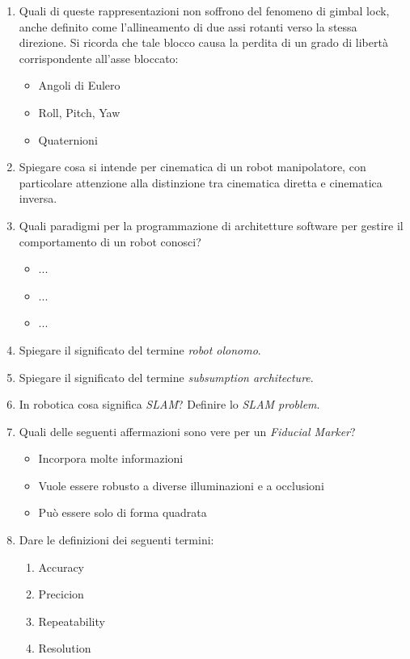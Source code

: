 \documentclass[a4paper,portrait,12pt]{article}
\theoremstyle{definition}
\begin{document}
\begin{enumerate}
\item Quali di queste rappresentazioni non soffrono del fenomeno di gimbal lock, anche definito come l'allineamento di due assi rotanti verso la stessa direzione.
Si ricorda che tale blocco causa la perdita di un grado di libertà corrispondente all'asse bloccato:
\begin{itemize}
\item Angoli di Eulero
\item Roll, Pitch, Yaw
\item Quaternioni
\end{itemize}

\item Spiegare cosa si intende per cinematica di un robot manipolatore, con particolare attenzione alla distinzione tra cinematica diretta e cinematica inversa.

\item Quali paradigmi per la programmazione di architetture software per gestire il comportamento di un robot conosci?
\begin{itemize}
\item ...
\item ...
\item ...
\end{itemize}

\item Spiegare il significato del termine \emph{robot olonomo}.
\item Spiegare il significato del termine \emph{subsumption architecture}.
\item In robotica cosa significa \emph{SLAM}? Definire lo \emph{SLAM problem}.
\item Quali delle seguenti affermazioni sono vere per un \emph{Fiducial Marker}?
\begin{itemize}
\item Incorpora molte informazioni
\item Vuole essere robusto a diverse illuminazioni e a occlusioni
\item Può essere solo di forma quadrata
\end{itemize}

\item Dare le definizioni dei seguenti termini:
\begin{enumerate}
\item Accuracy
\item Precicion
\item Repeatability
\item Resolution
\end{enumerate}


\end{enumerate}
\end{document}
